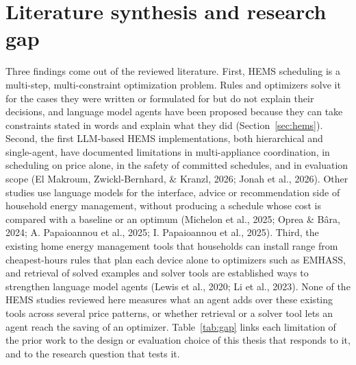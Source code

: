 \documentclass[12pt,a4paper]{report}
\begin{document}
\section{Literature synthesis and research gap}
\label{sec:gap}

Three findings come out of the reviewed literature. First, HEMS
scheduling is a multi-step, multi-constraint optimization problem. Rules
and optimizers solve it for the cases they were written or formulated
for but do not explain their decisions, and language model agents have
been proposed because they can take constraints stated in words and
explain what they did (Section~\ref{sec:hems}). Second, the first
LLM-based HEMS implementations, both hierarchical and
single-agent, have documented limitations in multi-appliance
coordination, in scheduling on price alone, in the safety of committed
schedules, and in evaluation scope (El Makroum, Zwickl-Bernhard, \& Kranzl, 2026; Jonah et
al., 2026). Other studies use language models for the interface, advice
or recommendation side of household energy management, without
producing a schedule whose cost is compared with a baseline or an
optimum (Michelon et al., 2025; Oprea \& Bâra, 2024; A. Papaioannou et
al., 2025; I. Papaioannou et al., 2025). Third, the existing home energy management tools that households can install range from
cheapest-hours rules that plan each device alone to optimizers such as
EMHASS, and retrieval of solved examples and solver tools are
established ways to strengthen language model agents (Lewis et al.,
2020; Li et al., 2023). None of the HEMS studies reviewed here measures
what an agent adds over these existing tools across several price
patterns, or whether retrieval or a solver tool lets an agent reach the
saving of an optimizer. Table~\ref{tab:gap} links each limitation of the prior work
to the design or evaluation choice of this thesis that responds to it,
and to the research question that tests it.
\end{document}
